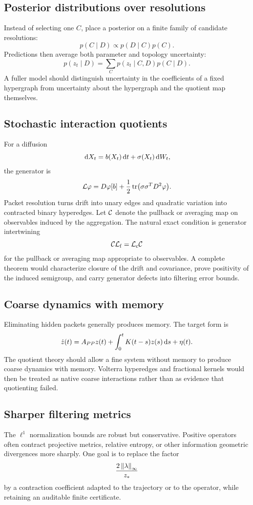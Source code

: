 \subsection{Posterior distributions over resolutions}
Instead of selecting one $C$, place a posterior on a finite family of candidate resolutions:
\[
  p(C\mid D)
  \propto
  p(D\mid C)p(C).
\]
Predictions then average both parameter and topology uncertainty:
\[
  p(z_t\mid D)
  =
  \sum_Cp(z_t\mid C,D)p(C\mid D).
\]
A fuller model should distinguish uncertainty in the coefficients of a fixed hypergraph from uncertainty about the hypergraph and the quotient map themselves.

\subsection{Stochastic interaction quotients}
For a diffusion
\[
  \,\mathrm d X_t=b(X_t)\,\mathrm d t+\sigma(X_t)\,\mathrm d W_t,
\]
the generator is
\[
  \mathcal L\varphi
  =D\varphi[b]
  +\frac12\operatorname{tr}\bigl(\sigma\sigma^TD^2\varphi\bigr).
\]
Packet resolution turns drift into unary edges and quadratic variation into contracted binary hyperedges.  Let $\mathcal C$ denote the pullback or averaging map on observables induced by the aggregation.  The natural exact condition is generator intertwining
\[
  \mathcal C\mathcal L_{\mathrm f}=\mathcal L_{\mathrm c}\mathcal C
\]
for the pullback or averaging map appropriate to observables.  A complete theorem would characterize closure of the drift and covariance, prove positivity of the induced semigroup, and carry generator defects into filtering error bounds.

\subsection{Coarse dynamics with memory}
Eliminating hidden packets generally produces memory.  The target form is
\[
  \dot z(t)
  =A_{PP}z(t)
  +\int_0^tK(t-s)z(s)\,\mathrm d s
  +\eta(t).
\]
The quotient theory should allow a fine system without memory to produce coarse dynamics with memory.  Volterra hyperedges and fractional kernels would then be treated as native coarse interactions rather than as evidence that quotienting failed.

\subsection{Sharper filtering metrics}
The $\ell^1$ normalization bounds are robust but conservative.  Positive operators often contract projective metrics, relative entropy, or other information geometric divergences more sharply.  One goal is to replace the factor
\[
  \frac{2\left\lVert \lambda\right\rVert_{\infty}}{z_*}
\]
by a contraction coefficient adapted to the trajectory or to the operator, while retaining an auditable finite certificate.

